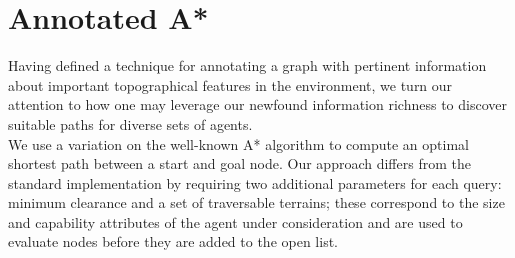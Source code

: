 \section{Annotated A*}
\label{aha:aastar}
Having defined a technique for annotating a graph with pertinent information about important topographical features in the environment, we turn our attention to how one may leverage our newfound information richness to discover suitable paths for diverse sets of agents. \\ \newline
We use a variation on the well-known A* algorithm \cite{astar} to compute an optimal shortest path between a start and goal node.  Our approach differs from the standard implementation by requiring two additional parameters for each query: minimum clearance and a set of traversable terrains; these correspond to the size and capability attributes of the agent under consideration and are used to evaluate nodes before they are added to the open list. \\ \newline

